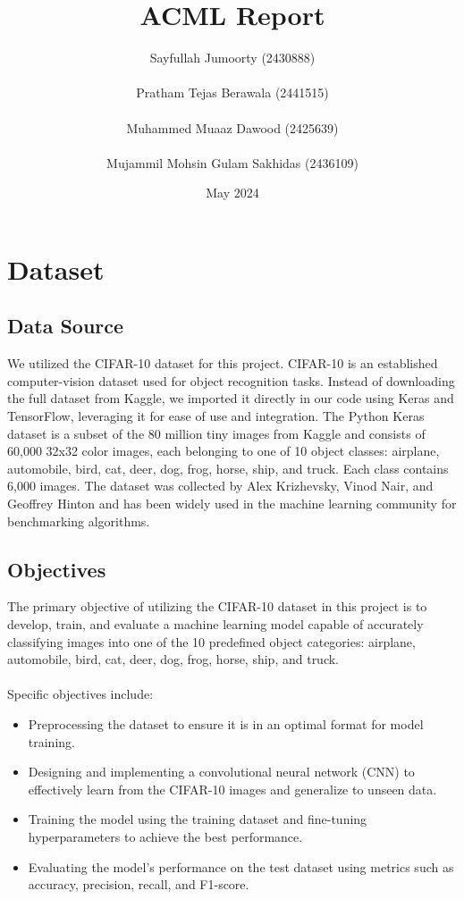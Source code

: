 \documentclass{article}
\title{ACML Report}
\author{
Sayfullah Jumoorty (2430888)
\\\\
Pratham Tejas Berawala (2441515)
\\ \\
Muhammed Muaaz Dawood (2425639)
\\ \\
Mujammil Mohsin Gulam Sakhidas (2436109)
}
\date{May 2024}
\begin{document}
\maketitle

\section{Dataset}
\subsection{Data Source} \label{SnD}
We utilized the CIFAR-10 dataset for this project. CIFAR-10 is an established computer-vision dataset used for object recognition tasks. Instead of downloading the full dataset from Kaggle, we imported it directly in our code using Keras and TensorFlow, leveraging it for ease of use and integration. The Python Keras dataset is a subset of the 80 million tiny images from Kaggle and consists of 60,000 32x32 color images, each belonging to one of 10 object classes: airplane, automobile, bird, cat, deer, dog, frog, horse, ship, and truck. Each class contains 6,000 images.
The dataset was collected by Alex Krizhevsky, Vinod Nair, and Geoffrey Hinton and has been widely used in the machine learning community for benchmarking algorithms.

\subsection{Objectives}
The primary objective of utilizing the CIFAR-10 dataset in this project is to develop, train, and evaluate a machine learning model capable of accurately classifying images into one of the 10 predefined object categories: airplane, automobile, bird, cat, deer, dog, frog, horse, ship, and truck. 
\\\\
Specific objectives include:
\begin{itemize}
    \item Preprocessing the dataset to ensure it is in an optimal format for model training.
    \item Designing and implementing a convolutional neural network (CNN) to effectively learn from the CIFAR-10 images and generalize to unseen data.
    \item Training the model using the training dataset and fine-tuning hyperparameters to achieve the best performance.
    \item Evaluating the model’s performance on the test dataset using metrics such as accuracy, precision, recall, and F1-score.
\end{itemize}
\end{document}
